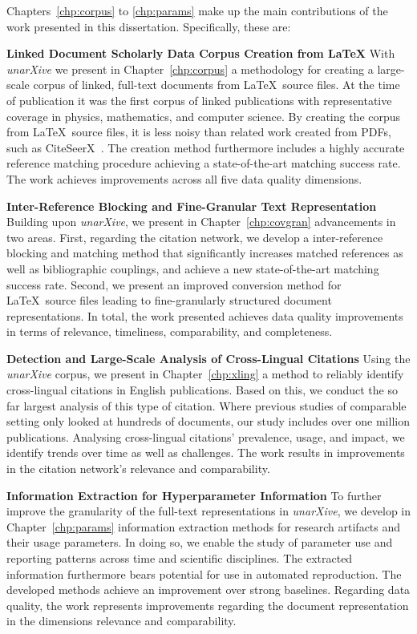 Chapters~\ref{chp:corpus} to \ref{chp:params} make up the main contributions of the work presented in this dissertation. Specifically, these are:

\textbf{Linked Document Scholarly Data Corpus Creation from \LaTeX} With \emph{unarXive} we present in Chapter~\ref{chp:corpus} a methodology for creating a large-scale corpus of linked, full-text documents from \LaTeX\ source files. At the time of publication it was the first corpus of linked publications with representative coverage in physics, mathematics, and computer science. By creating the corpus from \LaTeX\ source files, it is less noisy than related work created from PDFs, such as CiteSeerX~\cite{Wu2015}. The creation method furthermore includes a highly accurate reference matching procedure achieving a state-of-the-art matching success rate. The work achieves improvements across all five data quality dimensions.

\textbf{Inter-Reference Blocking and Fine-Granular Text Representation} Building upon \emph{unarXive}, we present in Chapter~\ref{chp:covgran} advancements in two areas. First, regarding the citation network, we develop a inter-reference blocking and matching method that significantly increases matched references as well as bibliographic couplings, and achieve a new state-of-the-art matching success rate. Second, we present an improved conversion method for \LaTeX\ source files leading to fine-granularly structured document representations. %
In total, the work presented achieves data quality improvements in terms of relevance, timeliness, comparability, and completeness.

\textbf{Detection and Large-Scale Analysis of Cross-Lingual Citations} Using the \emph{unarXive} corpus, we present in Chapter~\ref{chp:xling} a method to reliably identify cross-lingual citations in English publications. Based on this, we conduct the so far largest analysis of this type of citation. Where previous studies of comparable setting only looked at hundreds of documents, our study includes over one million publications. Analysing cross-lingual citations' prevalence, usage, and impact, we identify trends over time as well as challenges. The work results in improvements in the citation network's relevance and comparability.

\textbf{Information Extraction for Hyperparameter Information} To further improve the granularity of the full-text representations in \emph{unarXive}, we develop in Chapter~\ref{chp:params} information extraction methods for research artifacts and their usage parameters. In doing so, we enable the study of parameter use and reporting patterns across time and scientific disciplines. The extracted information furthermore bears potential for use in automated reproduction. The developed methods achieve an improvement over strong baselines. Regarding data quality, the work represents improvements regarding the document representation in the dimensions relevance and comparability.

